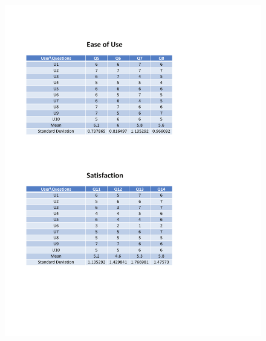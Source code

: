 \begin{appendices}
\begin{figure}[h!t]
    \centering
      \includegraphics[width=6in]{ch5/Result/Mobile/2.pdf}
  \label{fig:Result:EUS:Mobile}
\end{figure}



\end{appendices}

